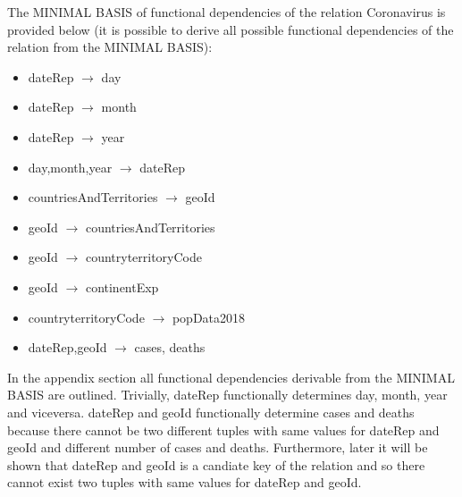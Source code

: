 \documentclass{article}
\begin{document}
 The MINIMAL BASIS of functional dependencies of the relation Coronavirus is provided below (it is possible to derive all possible functional dependencies of the relation from the MINIMAL BASIS): 
\begin{multicols}{2}
\begin{itemize}
    \item dateRep $\rightarrow$ day
    \item dateRep $\rightarrow$ month
    \item dateRep $\rightarrow$ year
    \item day,month,year $\rightarrow$ dateRep
    \item countriesAndTerritories $\rightarrow$ geoId
    \item geoId $\rightarrow$ countriesAndTerritories
    \item geoId $\rightarrow$ countryterritoryCode
    \item geoId $\rightarrow$ continentExp
    \item countryterritoryCode $\rightarrow$ popData2018
    \item dateRep,geoId $\rightarrow$ cases, deaths
     
\end{itemize}
\end{multicols}
In the appendix section \textcolor{blue}{} all functional dependencies derivable from the MINIMAL BASIS are outlined.
Trivially, dateRep functionally determines day, month, year and viceversa. dateRep and geoId functionally determine cases and deaths because there cannot be two different tuples with same values for dateRep and geoId and different number of cases and deaths. Furthermore, later it will be shown that dateRep and geoId is a candiate key of the relation and so there cannot exist two tuples with same values for dateRep and geoId.  
\end{document}
